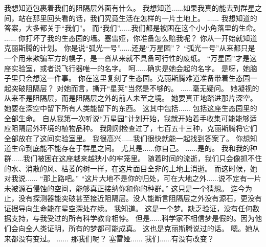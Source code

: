\documentclass[openany]{book}
\begin{document}
\begin{dialogue}
     我想知道包裹着我们的阻隔层外面有什么。
     我想知道......如果我真的能去到群星之间，站在那里回头看的话，我们究竟生活在怎样的一片土地上。
     ......
     我想知道的答案，大多都关于“我们”。
     而“我们”......我们都是被困在这个小小角落里的生命。
     ......
     你打坏了我的生态园的墙。塞雷娅，你准备怎么赔我呢？
     你从一开始就知道克丽斯腾的计划。
     你是说“弧光一号”......还是“万星园”？
     “弧光一号”从来都只是一个用来欺骗军方的幌子，是一沓从来就不具备可行性的废纸。
     “万星园”才是这座实验室，或者说飞行器唯一的名字。
     呵......确实是她会起的名字。
     是呀，她脑子里只会想这一件事。
     你在这里复刻了生态园。克丽斯腾难道准备带着生态园一起突破阻隔层？
     对她而言，撕开“星荚”当然是不够的。
     ......毫无疑问。
     她凝视的从来不是阻隔层，而是阻隔层之外的前人未至之境。
     她要真正地踏进那片深空。她要在深空中留下所有人类能留下的东西。
     这其中包括......
     包括这座生态园里的全部生命。
     自从我第一次听说“万星园”计划开始，我就开始着手收集可能能够适应阻隔层外环境的植物品种。
     我刚刚检查过了，七百五十三种，克丽斯腾将它们全部放在了这间实验室里。
     我很高兴......我们很快就能一起找到答案了。
     你想知道生命到底能不能存在于群星之间。
     尤其是......你自己。
     ......是的。
     我和我的种群......我们被困在这座越来越狭小的牢笼里。
     随着时间的流逝，我们只会像抓不住的水、消散的风、枯萎的树一样，在这片面目全非的土地上消逝。
     而这时候，她对我说......
     “那上路吧。”
     “这片大地不是你的归处，可在大地之外......说不定有一片未被源石侵蚀的空间，能够真正接纳你和你的种群。”
     这只是一个猜想。
     迄今为止，没有探测器能突破甚至接近阻隔层。没人能断言阻隔层之外没有源石，更没有证据导向生命能在星空深处存续。
     我知道。
     这是一个梦。缺乏验证，没有任何数据支持，与我受过的所有科学教育相悖。
     但是......科学家不相信梦是假的。因为他们会向全人类证明，所有的梦都可能成真。
     这也是克丽斯腾说过的话。
     嗯。她从来都没有变过。
     ......
     那我们呢？
     塞雷娅......
     我们......有没有改变？
\end{dialogue}\par
\end{document}
